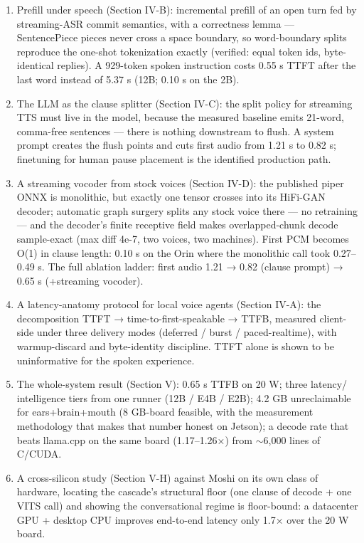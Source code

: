\documentclass[journal]{IEEEtran}
\begin{document}
    \begin{enumerate}
        \item Prefill under speech (Section IV-B): incremental prefill of an open turn fed by streaming-ASR commit semantics, with a correctness lemma — SentencePiece pieces never cross a space boundary, so word-boundary splits reproduce the one-shot tokenization exactly (verified: equal token ids, byte-identical replies). A 929-token spoken instruction costs 0.55 s TTFT after the last word instead of 5.37 s (12B; 0.10 s on the 2B).
        \item The LLM as the clause splitter (Section IV-C): the split policy for streaming TTS must live in the model, because the measured baseline emits 21-word, comma-free sentences — there is nothing downstream to flush. A system prompt creates the flush points and cuts first audio from 1.21 s to 0.82 s; finetuning for human pause placement is the identified production path.
        \item A streaming vocoder from stock voices (Section IV-D): the published piper ONNX is monolithic, but exactly one tensor crosses into its HiFi-GAN decoder; automatic graph surgery splits any stock voice there — no retraining — and the decoder's finite receptive field makes overlapped-chunk decode sample-exact (max diff 4e-7, two voices, two machines). First PCM becomes O(1) in clause length: 0.10 s on the Orin where the monolithic call took 0.27–0.49 s. The full ablation ladder: first audio 1.21 → 0.82 (clause prompt) → 0.65 s (+streaming vocoder).
        \item A latency-anatomy protocol for local voice agents (Section IV-A): the decomposition TTFT → time-to-first-speakable → TTFB, measured client-side under three delivery modes (deferred / burst / paced-realtime), with warmup-discard and byte-identity discipline. TTFT alone is shown to be uninformative for the spoken experience.
        \item The whole-system result (Section V): 0.65 s TTFB on 20 W; three latency/ intelligence tiers from one runner (12B / E4B / E2B); 4.2 GB unreclaimable for ears+brain+mouth (8 GB-board feasible, with the measurement methodology that makes that number honest on Jetson); a decode rate that beats llama.cpp on the same board (1.17–1.26×) from $\sim$6,000 lines of C/CUDA.
        \item A cross-silicon study (Section V-H) against Moshi on its own class of hardware, locating the cascade's structural floor (one clause of decode + one VITS call) and showing the conversational regime is floor-bound: a datacenter GPU + desktop CPU improves end-to-end latency only 1.7× over the 20 W board.
    \end{enumerate}
\end{document}
